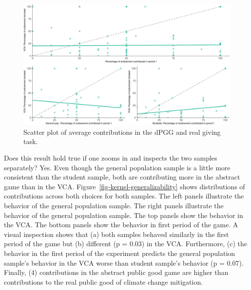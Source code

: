 \documentclass[
  authoryear,
  preprint,
  3p]{elsarticle}
\begin{document}
\begin{figure}

{\centering \includegraphics{paper_files/figure-pdf/fig-scatter-generalizability-1.pdf}

}

\caption{\label{fig-scatter-generalizability}Scatter plot of average
contributions in the dPGG and real giving task.}

\end{figure}

Does this result hold true if one zooms in and inspects the two samples
separately? Yes. Even though the general population sample is a little
more consistent than the student sample, both are contributing more in
the abstract game than in the VCA.
Figure~\ref{fig-kernel-generalizability} shows distributions of
contributions across both choices for both samples. The left panels
illustrate the behavior of the general population sample. The right
panels illustrate the behavior of the general population sample. The top
panels show the behavior in the VCA. The bottom panels show the behavior
in first period of the game. A visual inspection shows that (a) both
samples behaved similarly in the first period of the game but (b)
different (p = 0.03) in the VCA. Furthermore, (c) the behavior in the
first period of the experiment predicts the general population sample's
behavior in the VCA worse than student sample's behavior (p = 0.07).
Finally, (4) contributions in the abstract public good game are higher
than contributions to the real public good of climate change mitigation.
\end{document}
